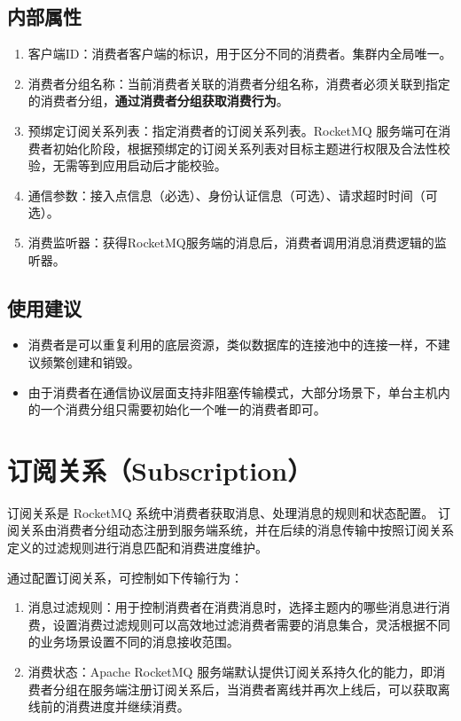 \documentclass[11pt, a4paper, oneside, fontset=none]{ctexbook}
\begin{document}
\subsection{内部属性}
\begin{enumerate}
  \item 客户端ID：消费者客户端的标识，用于区分不同的消费者。集群内全局唯一。
  \item 消费者分组名称：当前消费者关联的消费者分组名称，消费者必须关联到指定的消费者分组，\textbf{通过消费者分组获取消费行为}。
  \item 预绑定订阅关系列表：指定消费者的订阅关系列表。RocketMQ 服务端可在消费者初始化阶段，根据预绑定的订阅关系列表对目标主题进行权限及合法性校验，无需等到应用启动后才能校验。
  \item 通信参数：接入点信息（必选）、身份认证信息（可选）、请求超时时间（可选）。
  \item 消费监听器：获得RocketMQ服务端的消息后，消费者调用消息消费逻辑的监听器。
\end{enumerate}

\subsection{使用建议}
\begin{itemize}
  \item 消费者是可以重复利用的底层资源，类似数据库的连接池中的连接一样，不建议频繁创建和销毁。
  \item 由于消费者在通信协议层面支持非阻塞传输模式，大部分场景下，单台主机内的一个消费分组只需要初始化一个唯一的消费者即可。
\end{itemize}

\section{订阅关系（Subscription）}
订阅关系是 RocketMQ 系统中消费者获取消息、处理消息的规则和状态配置。
订阅关系由消费者分组动态注册到服务端系统，并在后续的消息传输中按照订阅关系定义的过滤规则进行消息匹配和消费进度维护。

通过配置订阅关系，可控制如下传输行为：
\begin{enumerate}
  \item 消息过滤规则：用于控制消费者在消费消息时，选择主题内的哪些消息进行消费，设置消费过滤规则可以高效地过滤消费者需要的消息集合，灵活根据不同的业务场景设置不同的消息接收范围。
  \item 消费状态：Apache RocketMQ 服务端默认提供订阅关系持久化的能力，即消费者分组在服务端注册订阅关系后，当消费者离线并再次上线后，可以获取离线前的消费进度并继续消费。
\end{enumerate}
\end{document}
